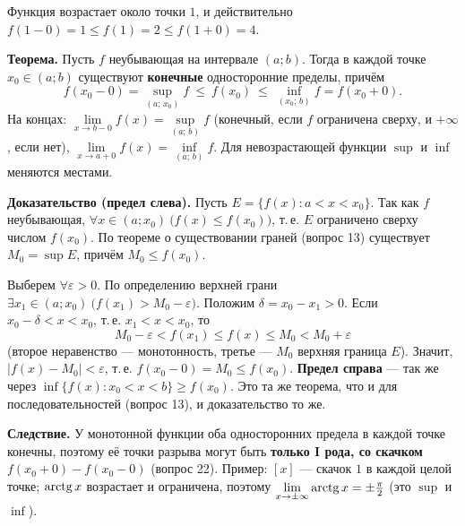 \documentclass[a4paper,11pt]{article}
\newcommand{\eps}{\varepsilon}
\begin{document}
\begin{center}
\end{center}

Функция возрастает около точки $1$, и действительно $f(1 - 0) = 1 \le f(1) = 2 \le f(1 + 0) = 4$.

\begin{dop}
\textbf{Теорема.} Пусть $f$ неубывающая на интервале $(a; b)$. Тогда в каждой точке $x_0 \in (a; b)$ существуют \textbf{конечные}
односторонние пределы, причём
\[
  f(x_0 - 0) = \sup_{(a;\, x_0)} f \ \le\ f(x_0) \ \le\ \inf_{(x_0;\, b)} f = f(x_0 + 0).
\]
На концах: $\lim\limits_{x \to b - 0} f(x) = \sup\limits_{(a;\, b)} f$ (конечный, если $f$ ограничена сверху, и $+\infty$, если нет),
$\lim\limits_{x \to a + 0} f(x) = \inf\limits_{(a;\, b)} f$. Для невозрастающей функции $\sup$ и $\inf$ меняются местами.

\textbf{Доказательство (предел слева).} Пусть $E = \{ f(x) : a < x < x_0 \}$. Так как $f$ неубывающая,
$\forall x \in (a; x_0)\ \bigl(f(x) \le f(x_0)\bigr)$, т.\,е. $E$ ограничено сверху числом $f(x_0)$. По теореме о существовании
граней (вопрос 13) существует $M_0 = \sup E$, причём $M_0 \le f(x_0)$.

Выберем $\forall \eps > 0$. По определению верхней грани $\exists x_1 \in (a; x_0)\ \bigl(f(x_1) > M_0 - \eps\bigr)$.
Положим $\delta = x_0 - x_1 > 0$. Если $x_0 - \delta < x < x_0$, т.\,е. $x_1 < x < x_0$, то
\[
  M_0 - \eps < f(x_1) \le f(x) \le M_0 < M_0 + \eps
\]
(второе неравенство --- монотонность, третье --- $M_0$ верхняя граница $E$). Значит, $|f(x) - M_0| < \eps$, т.\,е.
$f(x_0 - 0) = M_0 \le f(x_0)$. \textbf{Предел справа} --- так же через $\inf\{ f(x) : x_0 < x < b \} \ge f(x_0)$.
Это та же теорема, что и для последовательностей (вопрос 13), и доказательство то же.

\textbf{Следствие.} У монотонной функции оба односторонних предела в каждой точке конечны, поэтому её точки разрыва могут быть
\textbf{только I рода, со скачком} $f(x_0 + 0) - f(x_0 - 0)$ (вопрос 22). Пример: $[x]$ --- скачок $1$ в каждой целой точке;
$\operatorname{arctg} x$ возрастает и ограничена, поэтому $\lim\limits_{x \to \pm\infty} \operatorname{arctg} x = \pm\frac\pi2$ (это $\sup$ и $\inf$).
\end{dop}
\end{document}
